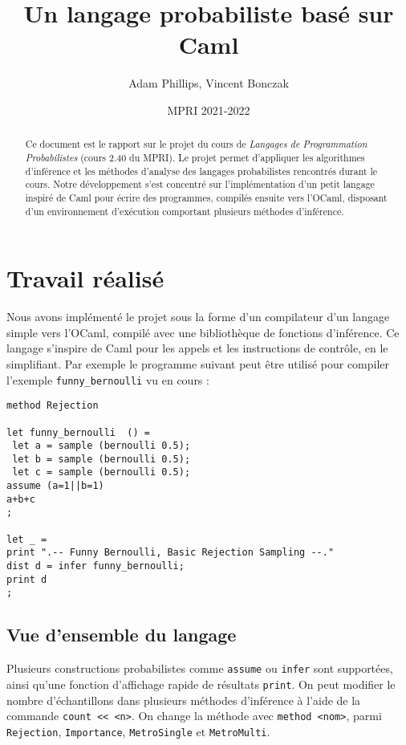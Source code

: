 \documentclass[svgnames]{article}
\begin{document}
\title{Un langage probabiliste basé sur Caml}

\author{Adam Phillips, Vincent Bonczak}

\date{MPRI 2021-2022}

\maketitle

\begin{abstract}
Ce document est le rapport sur le projet du cours de \emph{Langages de Programmation Probabilistes} (cours 2.40 du MPRI). 
Le projet permet d'appliquer les algorithmes d'inférence et les méthodes d'analyse des langages probabilistes rencontrés durant le cours. 
Notre développement s'est concentré sur l'implémentation d'un petit langage inspiré de Caml pour écrire des programmes, compilés ensuite vers
l'OCaml, disposant d'un environnement  d'exécution comportant plusieurs méthodes d'inférence.
\end{abstract}

\section{Travail réalisé}

Nous avons implémenté le projet sous la forme d'un compilateur d'un langage simple vers l'OCaml, compilé avec une bibliothèque de fonctions d'inférence.
Ce langage s'inspire de Caml pour les appels et les instructions de contrôle, en le simplifiant. Par exemple le programme suivant peut être utilisé pour compiler l'exemple \verb|funny_bernoulli| vu en cours :
\begin{lstlisting}
method Rejection

let funny_bernoulli  () =  
 let a = sample (bernoulli 0.5);
 let b = sample (bernoulli 0.5);  
 let c = sample (bernoulli 0.5); 
assume (a=1||b=1)
a+b+c
;

let _ = 
print ".-- Funny Bernoulli, Basic Rejection Sampling --."
dist d = infer funny_bernoulli;
print d
;
\end{lstlisting}

\subsection{Vue d'ensemble du langage}
 
Plusieurs constructions probabilistes comme \verb|assume| ou \verb|infer| sont supportées, ainsi qu'une fonction d'affichage rapide de résultats \verb|print|.
On peut modifier le nombre d'échantillons dans plusieurs méthodes d'inférence à l'aide de la commande \lstinline|count << <n>|.
On change la méthode avec \lstinline|method <nom>|, parmi  \verb|Rejection|, \verb|Importance|, \verb|MetroSingle| et \verb|MetroMulti|.
\end{document}
